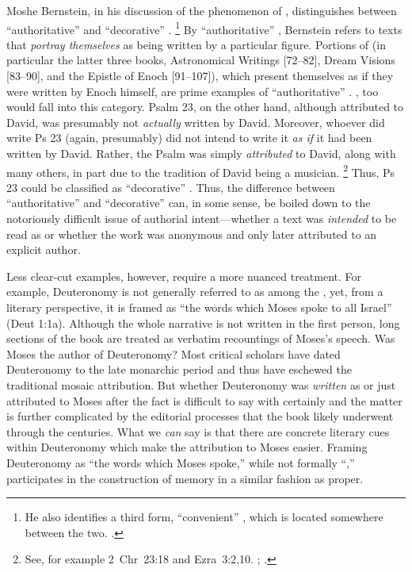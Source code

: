 Moshe Bernstein, in his discussion of the phenomenon of \psy, distinguishes between ``authoritative'' \psy and ``decorative'' \psy.%
    \footnote{He also identifies a third form, ``convenient'' \psy, which is located somewhere between the two. \cite[3--7]{bernstein_chazon-etal1999}.}
By ``authoritative'' \psy, Bernstein refers to texts that \emph{portray themselves} as being written by a particular figure. Portions of \firstenoch (in particular the latter three books, Astronomical Writings [72--82], Dream Visions [83--90], and the Epistle of Enoch [91--107]), which present themselves as if they were written by Enoch himself, are prime examples of ``authoritative'' \psy. \GA, too would fall into this category. Psalm 23, on the other hand, although attributed to David, was presumably not \emph{actually} written by David. Moreover, whoever did write Ps 23 (again, presumably) did not intend to write it \emph{as if} it had been written by David. Rather, the Psalm was simply \emph{attributed} to David, along with many others, in part due to the tradition of David being a musician.%
    \footnote{See, for example 2~Chr~23:18 and Ezra~3:2,10. \cite{mays_interpretation1986}; \cite{sarna_stein-loewe1979}.}
Thus, Ps 23 could be classified as ``decorative'' \psy. Thus, the difference between ``authoritative'' and ``decorative'' \psy can, in some sense, be boiled down to the notoriously difficult issue of authorial intent---whether a text was \emph{intended} to be read as \psa or whether the work was anonymous and only later attributed to an explicit author.

Less clear-cut examples, however, require a more nuanced treatment. For example, Deuteronomy is not generally referred to as among the \psa, yet, from a literary perspective, it is framed as  ``the words which Moses spoke to all Israel'' (Deut 1:1a). Although the whole narrative is not written in the first person, long sections of the book are treated as verbatim recountings of Moses's speech. Was Moses the author of Deuteronomy? Most critical scholars have dated Deuteronomy to the late monarchic period and thus have eschewed the traditional mosaic attribution. But whether Deuteronomy was \emph{written} as \psa or just attributed to Moses after the fact is difficult to say with certainly and the matter is further complicated by the editorial processes that the book likely underwent through the centuries.%
    \autocite[143--172]{toorn2007}
What we \emph{can} say is that there are concrete literary cues within Deuteronomy which make the attribution to Moses easier. Framing Deuteronomy as ``the words which Moses spoke,'' while not formally ``\psa,'' participates in the construction of memory in a similar fashion as \psa proper.

